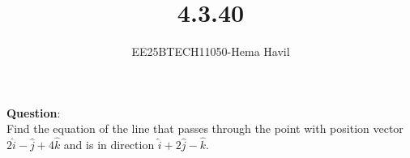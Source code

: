 \documentclass[journal]{IEEEtran}
\begin{document}

\vspace{3cm}
\title{4.3.40}
\author{EE25BTECH11050-Hema Havil}
	\maketitle
	{\let\newpage\relax\maketitle}
	
	\renewcommand{\thefigure}{\theenumi}
	\renewcommand{\thetable}{\theenumi}
	\setlength{\intextsep}{12pt} %
	
	\renewcommand{\thetable}{\theenumi}
	
	\textbf{Question}:\\
    
         Find the equation of the line that passes through the point with position vector
        $2\hat{i}-\hat{j}+4\hat{k}$ and is in direction $\hat{i}+2\hat{j}-\hat{k}$.
         
\end{document}
